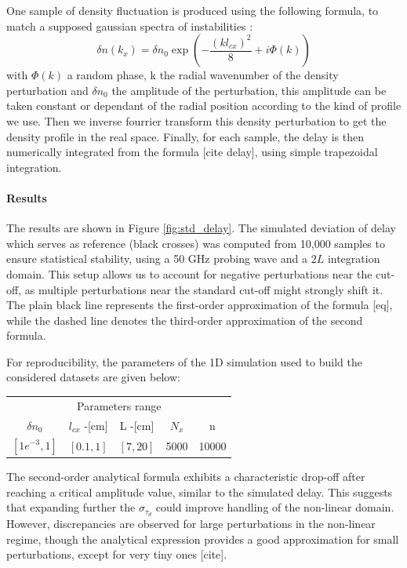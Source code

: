 \documentclass[11pt,a4paper,openany]{report}
\begin{document}
\begin{multicols}{2}
    One sample of density fluctuation is produced using the following formula, to match a supposed gaussian spectra of instabilities :
    $$\delta n(k_x) = \delta n_0 \exp\left(-\frac{(kl_{cx})^2}{8} + i\Phi(k)\right)$$
    with $\Phi(k)$ a random phase, k the radial wavenumber of the density perturbation and $\delta n_0$ the amplitude of the perturbation, this amplitude can be taken constant or dependant of the radial position according to the kind of profile we use. Then we inverse fourrier transform this density perturbation to get the density profile in the real space. Finally, for each sample, the delay is then numerically integrated from the formula [cite delay], using simple trapezoidal integration.
    \paragraph*{Results}
    The results are shown in Figure \ref{fig:std_delay}. The simulated deviation of delay which serves as reference (black crosses) was computed from 10,000 samples to ensure statistical stability, using a 50 GHz probing wave and a $2L$ integration domain. This setup allows us to account for negative perturbations near the cut-off, as multiple perturbations near the standard cut-off might strongly shift it. The plain black line represents the first-order approximation of the formula [eq], while the dashed line denotes the third-order approximation of the second formula.

    For reproducibility, the parameters of the 1D simulation used to build the considered datasets are given below:
    \setlength{\tabcolsep}{.038\linewidth}
    \renewcommand{\arraystretch}{1.5}
    \begin{center}
        \begin{tabular}{ccccc}
            \toprule
            \multicolumn{5}{c}{Parameters range}                       \\
            \cmidrule{1 -5}
            $\delta n_0$   & $l_{cx}$ -[cm] & L -[cm]  & $N_x$ & n     \\
            \midrule
            $[1e^{-3}, 1]$ & $[0.1,1]$      & $[7,20]$ & 5000  & 10000 \\
            \bottomrule
        \end{tabular}
    \end{center}


    The second-order analytical formula exhibits a characteristic drop-off after reaching a critical amplitude value, similar to the simulated delay. This suggests that expanding further the $\sigma_{\tau_d}$ could improve handling of the non-linear domain. However, discrepancies are observed for large perturbations in the non-linear regime, though the analytical expression provides a good approximation for small perturbations, except for very tiny ones [cite].


\end{multicols}
\end{document}
